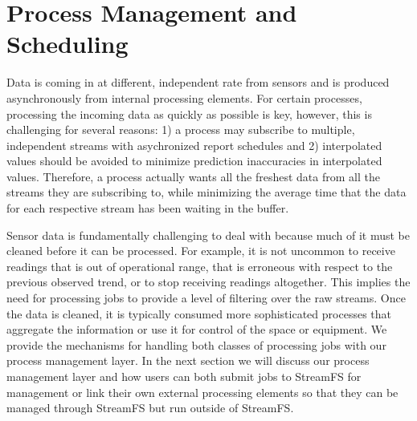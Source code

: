\chapter{Process Management and Scheduling}
\label{chap:ProcMngtSchedMain}

Data is coming in at different, independent rate from sensors and is produced asynchronously from internal processing elements.
For certain processes, processing the incoming data as quickly as possible is key, however, this is challenging for several reasons:
1) a process may subscribe to multiple, independent streams with asychronized report schedules and 2) interpolated values
should be avoided to minimize prediction inaccuracies in interpolated values.  Therefore, a process actually wants all the freshest
data from all the streams they are subscribing to, while minimizing the average time that the data for each respective stream has 
been waiting in the buffer.

Sensor data is fundamentally challenging to deal with because much of it must be cleaned before it can be processed.  For example,
it is not uncommon to receive readings that is out of operational range, that is erroneous with respect to the previous observed trend,
or to stop receiving readings altogether.  This implies the need for processing jobs to provide a level of filtering over the raw streams.
Once the data is cleaned, it is typically consumed more sophisticated processes that aggregate the information or use it for control
of the space or equipment.  We provide the mechanisms for handling both classes of processing jobs with our process management layer.
In the next section we will discuss our process management layer and how users can both submit jobs to StreamFS for management or link
their own external processing elements so that they can be managed through StreamFS but run outside of StreamFS.

% 







